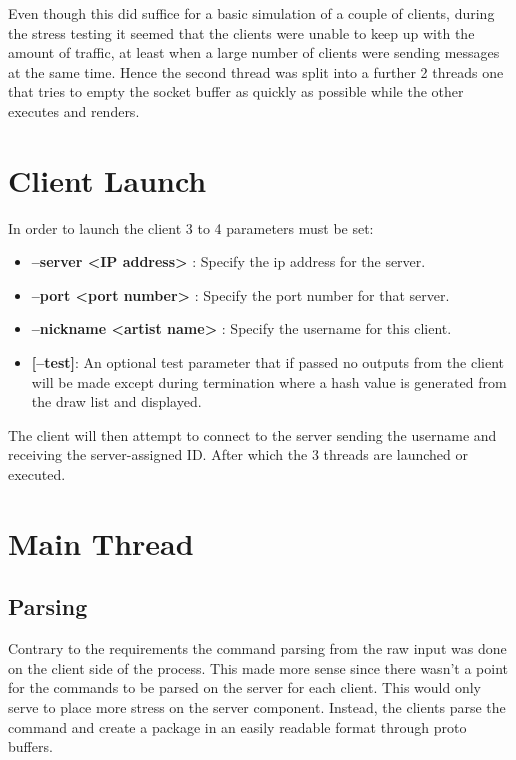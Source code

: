 \documentclass[12pt, a4paper]{report}
\begin{document}
Even though this did suffice for a basic simulation of a couple of clients, during the stress testing it seemed that the clients were unable to keep up with the amount of traffic, at least when a large number of clients were sending messages at the same time. Hence the second thread was split into a further 2 threads one that tries to empty the socket buffer as quickly as possible while the other executes and renders.

\section{Client Launch}
In order to launch the client 3 to 4 parameters must be set:
\begin{itemize}
    \item \textbf{--server <IP address>} : Specify the ip address for the server.
    \item \textbf{--port <port number>} : Specify the port number for that server.
    \item \textbf{--nickname <artist name>} : Specify the username for this client.
    \item \textbf{[--test]}: An optional test parameter that if passed no outputs from the client will be made except during termination where a hash value is generated from the draw list and displayed.
\end{itemize}

The client will then attempt to connect to the server sending the username and receiving the server-assigned ID. After which the 3 threads are launched or executed.



\section{Main Thread}
\subsection{Parsing}
Contrary to the requirements the command parsing from the raw input was done on the client side of the process. This made more sense since there wasn't a point for the commands to be parsed on the server for each client. This would only serve to place more stress on the server component. Instead, the clients parse the command and create a package in an easily readable format through proto buffers.
\end{document}
